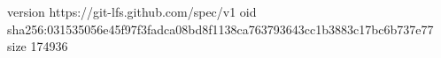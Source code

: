 version https://git-lfs.github.com/spec/v1
oid sha256:031535056e45f97f3fadca08bd8f1138ca763793643cc1b3883c17bc6b737e77
size 174936
